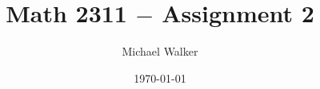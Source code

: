 \documentclass[11pt]{article}
\author{Michael Walker}
\title{Math 2311 $-$ Assignment 2}
\date{\today}
\begin{document}
\maketitle
\pagebreak

\tableofcontents
\pagebreak


\pagebreak


\pagebreak


\pagebreak


\pagebreak


\pagebreak


\end{document}
